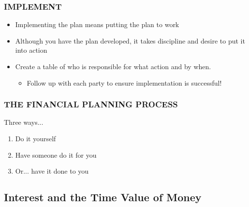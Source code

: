 \documentclass[12pt]{article}
\begin{document}
            \subsubsection{IMPLEMENT}
                \begin{itemize}
                    \item Implementing the plan means putting the plan to work
                    \item Although you have the plan developed, it takes discipline and desire to put it into action
                    \item Create a table of who is responsible for what action and by when.
                        \begin{itemize}
                            \item Follow up with each party to ensure implementation is successful!
                        \end{itemize}
                \end{itemize}
            \subsubsection{THE FINANCIAL PLANNING PROCESS}
                Three ways...
                \begin{enumerate}
                    \item Do it yourself
                    \item Have someone do it for you
                    \item Or... have it done to you
                \end{enumerate}

        \subsection{Interest and the Time Value of Money}
\end{document}
